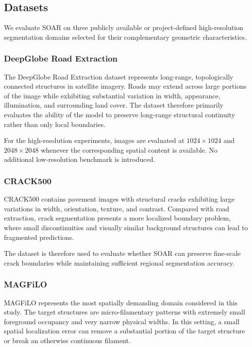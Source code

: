 \documentclass[11pt,a4paper]{article}
\begin{document}
\subsection{Datasets}

We evaluate SOAR on three publicly available or project-defined 
high-resolution segmentation domains selected for their complementary 
geometric characteristics.

\subsubsection{DeepGlobe Road Extraction}

The DeepGlobe Road Extraction dataset represents long-range, 
topologically connected structures in satellite imagery. Roads may extend 
across large portions of the image while exhibiting substantial variation 
in width, appearance, illumination, and surrounding land cover. The dataset 
therefore primarily evaluates the ability of the model to preserve 
long-range structural continuity rather than only local boundaries.

For the high-resolution experiments, images are evaluated at 
$1024\times1024$ and $2048\times2048$ whenever the corresponding spatial 
content is available. No additional low-resolution benchmark is introduced.

\subsubsection{CRACK500}

CRACK500 contains pavement images with structural cracks exhibiting large 
variations in width, orientation, texture, and contrast. Compared with road 
extraction, crack segmentation presents a more localized boundary problem, 
where small discontinuities and visually similar background structures can 
lead to fragmented predictions.

The dataset is therefore used to evaluate whether SOAR can preserve 
fine-scale crack boundaries while maintaining sufficient regional 
segmentation accuracy.

\subsubsection{MAGFiLO}

MAGFiLO represents the most spatially demanding domain considered in this 
study. The target structures are micro-filamentary patterns with extremely 
small foreground occupancy and very narrow physical widths. In this setting,
a small spatial localization error can remove a substantial portion of the 
target structure or break an otherwise continuous filament.
\end{document}
